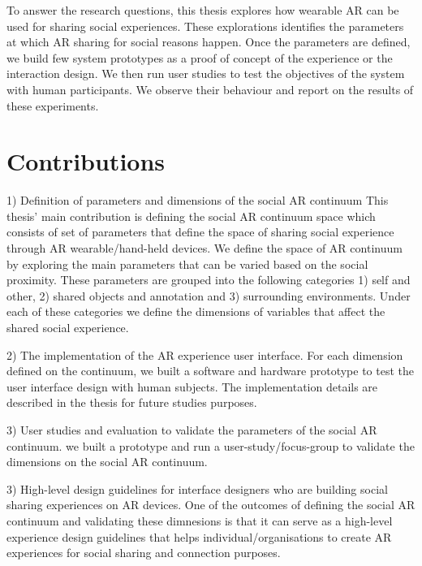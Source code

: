 To answer the research questions, this thesis explores how wearable AR can be used for sharing social experiences. These explorations identifies the parameters at which AR sharing for social reasons happen. Once the parameters are defined, we build few system prototypes as a proof of concept of the experience or the interaction design. We then run user studies to test the objectives of the system with human participants. We observe their behaviour and report on the results of these experiments. 

\section{Contributions}

1) Definition of parameters and dimensions of the social AR continuum 
This thesis' main contribution is defining the social AR continuum space which consists of set of parameters that define the space of sharing social experience through AR wearable/hand-held devices. We define the space of AR continuum by exploring the main parameters that can be varied based on the social proximity. These parameters are grouped into the following categories 1) self and other, 2) shared objects and annotation and 3) surrounding environments. Under each of these categories we define the dimensions of variables that affect the shared social experience. 

2) The implementation of the AR experience user interface. For each dimension defined on the continuum, we built a software and hardware prototype to test the user interface design with human subjects. The implementation details are described in the thesis for future studies purposes.

3) User studies and evaluation to validate the parameters of the social AR continuum.  we built a prototype and run a user-study/focus-group to validate the dimensions on the social AR continuum. 

3) High-level design guidelines for interface designers who are building social sharing experiences on AR devices. One of the outcomes of defining the social AR continuum and validating these dimnesions is that it can serve as a high-level experience design guidelines that helps individual/organisations to create AR experiences for social sharing and connection purposes.





